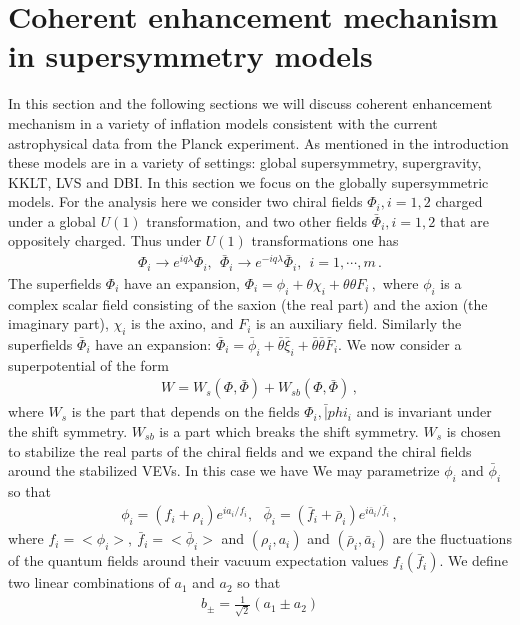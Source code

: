 \documentclass[12pt]{article}
\begin{document}
\section{Coherent enhancement mechanism in supersymmetry models}
In this section and the following sections we will discuss coherent enhancement mechanism in a variety of inflation models consistent with the current astrophysical data
from the Planck experiment. As mentioned in the introduction these models are in a variety of settings: global supersymmetry, supergravity,
KKLT, LVS and DBI. In this section we focus on the globally supersymmetric models.
For the analysis here we consider two chiral fields $\Phi_i, i=1,2$ charged under a global $U(1)$
transformation, and two other fields $\bar\Phi_i, i=1,2$ that are oppositely charged.
Thus under $U(1)$ transformations one
has
\begin{align}
  \Phi_i\to e^{i q \lambda} \Phi_i, ~~\bar \Phi_i\to e^{-i q \lambda} \bar \Phi_i, ~~i=1, \cdots, m\,.
\end{align}
The superfields ${\Phi}_{i}$ have an expansion,
${\Phi}_{i} = {\phi}_{i} + \theta {\chi}_{i} + \theta \theta {F}_{i}\,,$
where ${\phi}_{i}$ is a complex scalar field consisting of the saxion (the real part) and the axion (the imaginary
part), ${\chi}_{i}$ is the axino, and ${F}_{i}$ is an auxiliary field.
Similarly the superfields $\bar {\Phi}_{i}$ have an expansion:
$\bar {\Phi}_{i} = \bar {\phi}_{i} + \bar \theta \bar {\xi}_{i} + \bar\theta \bar \theta \bar{F}_{i}$.
We now consider a superpotential of the form
\begin{align}
  W = W_s(\Phi,\bar \Phi) + W_ {sb} (\Phi, \bar \Phi)\,,
  \label{wsn}
\end{align}
where $W_s$ is the part that depends on the fields $\Phi_i, \bar |phi_i$ and is invariant under the shift symmetry.
$W_{sb}$ is a part which breaks the shift symmetry. $W_s$ is chosen to stabilize the real parts of the chiral fields
and we expand the chiral fields around the stabilized VEVs. In this case we have
We may parametrize $\phi_i$ and $\bar \phi_i$ so that
\begin{align}
  \phi_i = (f_i + \rho_i) e^{ia_i/f_i}, ~~~\bar\phi_i = (\bar f_i + \bar \rho_i) e^{i\bar a_i/\bar f_i}\,,
\end{align}
where $f_i= <\phi_i> ,~\bar f_i= <\bar\phi_i>$ and $(\rho_i, a_i)$ and $(\bar \rho_i, \bar a_i)$
are the fluctuations of the quantum fields around their vacuum expectation values $f_i(\bar f_i)$.
We define two linear combinations of $a_1$ and $a_2$ so that
\begin{align}
  b_{\pm}= \frac{1}{\sqrt 2} (a_1\pm a_2)
  \label{b+b-}
\end{align}
\end{document}
